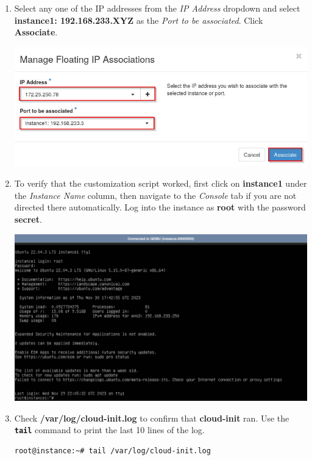 \documentclass[letterpaper, 12pt]{article}
\begin{document}
\begin{enumerate}
    \item Select any one of the IP addresses from the \textit{IP Address} dropdown and select
    \textbf{instance1: 192.168.233.XYZ} as the \textit{Port to be associated}. Click \textbf{Associate}.

    \begin{center}
        \includegraphics[width=\linewidth]{images/part1/step28.png}
    \end{center}

    \item To verify that the customization script worked, first click on \textbf{instance1} under the
    \textit{Instance Name} column, then navigate to the \textit{Console} tab if you are not directed there
    automatically. Log into the instance as \textbf{root} with the password \textbf{secret}.

    \begin{center}
        \includegraphics[width=\linewidth]{images/part1/step29.png}
    \end{center}

    \item Check \textbf{/var/log/cloud-init.log} to confirm that \textbf{cloud-init} ran. Use the \textbf{\texttt{tail}}
    command to print the last 10 lines of the log.
\begin{lstlisting}
root@instance:~# tail /var/log/cloud-init.log
\end{lstlisting}


\end{enumerate}
\end{document}
